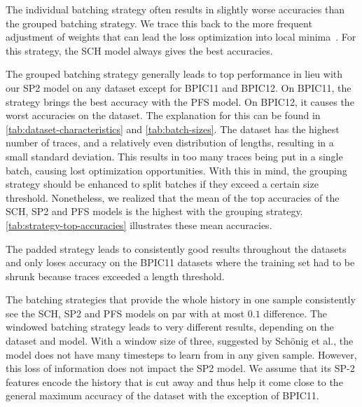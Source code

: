 The individual batching strategy often results in slightly worse accuracies than the grouped batching strategy. We trace this back to the more frequent adjustment of weights that can lead the loss optimization into local minima~\cite{keskar2016large}. For this strategy, the SCH model always gives the best accuracies.

The grouped batching strategy generally leads to top performance in lieu with our SP2 model on any dataset except for BPIC11 and BPIC12. On BPIC11, the strategy brings the best accuracy with the PFS model. On BPIC12, it causes the worst accuracies on the dataset. The explanation for this can be found in \autoref{tab:dataset-characteristics} and \autoref{tab:batch-sizes}. The dataset has the highest number of traces, and a relatively even distribution of lengths, resulting in a small standard deviation. This results in too many traces being put in a single batch, causing lost optimization opportunities. With this in mind, the grouping strategy should be enhanced to split batches if they exceed a certain size threshold. Nonetheless, we realized that the mean of the top accuracies of the SCH, SP2 and PFS models is the highest with the grouping strategy. \autoref{tab:strategy-top-accuracies} illustrates these mean accuracies.

The padded strategy leads to consistently good results throughout the datasets and only loses accuracy on the BPIC11 datasets where the training set had to be shrunk because traces exceeded a length threshold.

The batching strategies that provide the whole history in one sample consistently see the SCH, SP2 and PFS models on par with at most $0.1$ difference. The windowed batching strategy leads to very different results, depending on the dataset and model. With a window size of three, suggested by Schönig et al., the model does not have many timesteps to learn from in any given sample. However, this loss of information does not impact the SP2 model. We assume that its SP-2 features encode the history that is cut away and thus help it come close to the general maximum accuracy of the dataset with the exception of BPIC11.


